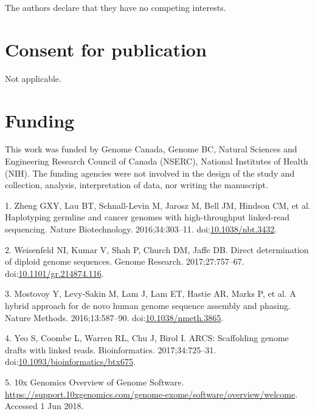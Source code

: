 \documentclass{bmcart}
\begin{document}
\begin{backmatter}
The authors declare that they have no competing interests.

\hypertarget{consent-for-publication}{%
\section*{Consent for publication}\label{consent-for-publication}}

Not applicable.

\hypertarget{funding}{%
\section*{Funding}\label{funding}}

This work was funded by Genome Canada, Genome BC, Natural Sciences and Engineering Research Council of Canada (NSERC), National Institutes of Health (NIH). The funding agencies were not involved in the design of the study and collection, analysis, interpretation of data, nor writing the manuscript.




\hypertarget{refs}{}
\leavevmode\hypertarget{ref-Zheng_2016}{}%
1. Zheng GXY, Lau BT, Schnall-Levin M, Jarosz M, Bell JM, Hindson CM, et al. Haplotyping germline and cancer genomes with high-throughput linked-read sequencing. Nature Biotechnology. 2016;34:303--11. doi:\href{https://doi.org/10.1038/nbt.3432}{10.1038/nbt.3432}.

\leavevmode\hypertarget{ref-Weisenfeld_2017}{}%
2. Weisenfeld NI, Kumar V, Shah P, Church DM, Jaffe DB. Direct determination of diploid genome sequences. Genome Research. 2017;27:757--67. doi:\href{https://doi.org/10.1101/gr.214874.116}{10.1101/gr.214874.116}.

\leavevmode\hypertarget{ref-Mostovoy_2016}{}%
3. Mostovoy Y, Levy-Sakin M, Lam J, Lam ET, Hastie AR, Marks P, et al. A hybrid approach for de novo human genome sequence assembly and phasing. Nature Methods. 2016;13:587--90. doi:\href{https://doi.org/10.1038/nmeth.3865}{10.1038/nmeth.3865}.

\leavevmode\hypertarget{ref-Yeo_2017}{}%
4. Yeo S, Coombe L, Warren RL, Chu J, Birol I. ARCS: Scaffolding genome drafts with linked reads. Bioinformatics. 2017;34:725--31. doi:\href{https://doi.org/10.1093/bioinformatics/btx675}{10.1093/bioinformatics/btx675}.

\leavevmode\hypertarget{ref-URL_10x}{}%
5. 10x Genomics Overview of Genome Software. \url{https://support.10xgenomics.com/genome-exome/software/overview/welcome}. Accessed 1 Jun 2018.


\end{backmatter}
\end{document}
